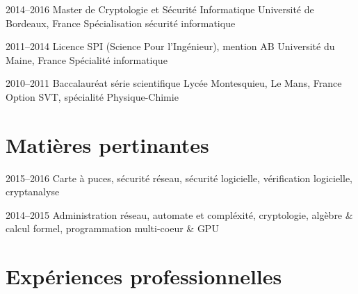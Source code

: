 \documentclass[]{friggeri-cv} %
\begin{document}
\begin{entrylist}


\entry
{2014--2016}
{Master de Cryptologie et Sécurité Informatique}
{Université de Bordeaux, France}
{Spécialisation sécurité informatique}


\entry
{2011--2014}
{Licence SPI (Science Pour l'Ingénieur), mention AB}
{Université du Maine, France}
{Spécialité informatique}




\entry
{2010--2011}
{Baccalauréat série scientifique}
{Lycée Montesquieu, Le Mans, France}
{Option SVT, spécialité Physique-Chimie}


\end{entrylist}


\section{Matières pertinantes}

\begin{entrylist}


\entry
{2015--2016}
{Carte à puces, sécurité réseau, sécurité logicielle, vérification logicielle, cryptanalyse}
{}

\entry
{2014--2015}
{Administration réseau, automate et compléxité, cryptologie, algèbre \& calcul formel, programmation multi-coeur \& GPU}
{}

\end{entrylist}


\section{Expériences professionnelles}
\end{document}

